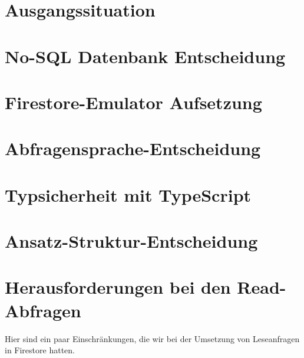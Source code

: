 \documentclass[12pt,a4paper%
              ,oneside     %
              ,titlepage
              ,DIV=13
              ,headinclude
              ,footinclude=false%
              ,cleardoublepage=empty%
              ,parskip=half,
              BCOR=0mm,
              ]{scrreprt}
\begin{document}
\selectlanguage{\thesisLanguage}

\setcounter{page}{1}

\THAtitlepage

\tableofcontents


\setcounter{page}{1}

\chapter{Ausgangssituation}
\chapter{No-SQL Datenbank Entscheidung}
\chapter{Firestore-Emulator Aufsetzung}
\chapter{Abfragensprache-Entscheidung}
\chapter{Typsicherheit mit TypeScript}
\chapter{Ansatz-Struktur-Entscheidung}
\chapter{Herausforderungen bei den Read-Abfragen}
Hier sind ein paar Einschränkungen, die wir bei der Umsetzung von Leseanfragen in Firestore hatten. 
\end{document}
